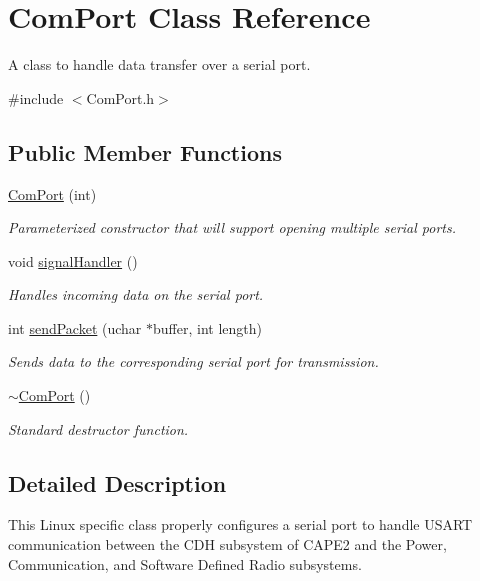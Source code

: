 \hypertarget{class_com_port}{
\section{ComPort Class Reference}
\label{class_com_port}
}


A class to handle data transfer over a serial port.  




{\ttfamily \#include $<$ComPort.h$>$}

\subsection*{Public Member Functions}
\begin{DoxyCompactItemize}
\item 
\hyperlink{class_com_port_af492fe14608a429a24d851f9f2f44a2e}{ComPort} (int)
\begin{DoxyCompactList}\small\item\em Parameterized constructor that will support opening multiple serial ports. \item\end{DoxyCompactList}\item 
void \hyperlink{class_com_port_a6cbd25d3c52c3fd250109e86d998ce4b}{signalHandler} ()
\begin{DoxyCompactList}\small\item\em Handles incoming data on the serial port. \item\end{DoxyCompactList}\item 
int \hyperlink{class_com_port_a60fac67ef62cd6ab7cc33cb23a0896e3}{sendPacket} (uchar $\ast$buffer, int length)
\begin{DoxyCompactList}\small\item\em Sends data to the corresponding serial port for transmission. \item\end{DoxyCompactList}\item 
\hyperlink{class_com_port_a60f4557b68a559975a0404f77480e038}{$\sim$ComPort} ()
\begin{DoxyCompactList}\small\item\em Standard destructor function. \item\end{DoxyCompactList}\end{DoxyCompactItemize}


\subsection{Detailed Description}
This Linux specific class properly configures a serial port to handle USART communication between the CDH subsystem of CAPE2 and the Power, Communication, and Software Defined Radio subsystems. 

